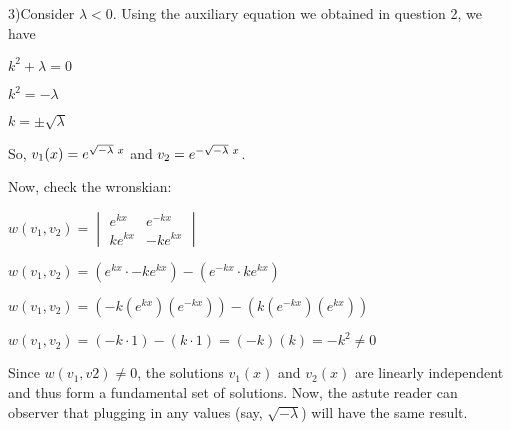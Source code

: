 \documentclass[12pt, executivepaper]{article}
\begin{document}
\vspace{5mm}

\begin{flushleft}

3)Consider $\lambda < 0$. Using the auxiliary equation we obtained in question 2, we have \\

\begin{center}

$k^2+ \lambda=0$

$k^2=-\lambda$

$k=\pm \sqrt{\lambda}$

\end{center}

So, $v_{1}(x)=e^{\sqrt{-\lambda} \hspace{1mm} x}$ and $v_{2}=e^{-\sqrt{-\lambda} \hspace{1mm} x}$.

\hspace{3mm}

Now, check the wronskian:

\begin{center}

$w(v_{1}, v_{2})=\begin{vmatrix}
e^{kx} & e^{-kx} \\ 
ke^{kx} & -ke^{kx} 
\end{vmatrix}$

$w(v_{1}, v_{2})=(e^{kx} \cdot -ke^{kx})-(e^{-kx} \cdot ke^{kx})$

$w(v_{1}, v_{2})=(-k(e^{kx})(e^{-kx}))-(k(e^{-kx})(e^{kx}))$

$w(v_{1}, v_{2})=(-k \cdot 1)-(k \cdot 1)=(-k)(k)=-k^2 \neq 0$

\end{center}

Since $w(v_{1}, v{2}) \neq 0$, the solutions $v_{1}(x)$ and $v_{2}(x)$ are linearly independent and thus form a fundamental set of solutions. Now, the astute reader can observer that plugging in any values (say, $\sqrt{-\lambda}$) will have the same result.

\end{flushleft}

\pagebreak

\vspace*{-40mm}
\end{document}
